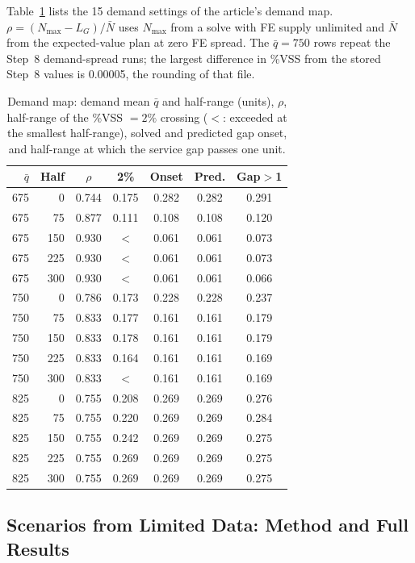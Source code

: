 Table~\ref{tab:S-extA-demand} lists the 15 demand settings of the article's demand map. $\rho=(N_{\max}-L_G)/\bar N$ uses $N_{\max}$ from a solve with FE supply unlimited and $\bar N$ from the expected-value plan at zero FE spread. The $\bar q=750$ rows repeat the Step~8 demand-spread runs; the largest difference in \%VSS from the stored Step~8 values is 0.00005, the rounding of that file.

\begin{table}[t]
\centering
\caption{Demand map: demand mean $\bar q$ and half-range (units), $\rho$, half-range of the \%VSS $=2\%$ crossing ($<$: exceeded at the smallest half-range), solved and predicted gap onset, and half-range at which the service gap passes one unit.}
\label{tab:S-extA-demand}
\footnotesize
\setlength{\tabcolsep}{3.5pt}
\begin{tabular}{@{}rrccccc@{}}
\toprule
$\bar q$ & \textbf{Half} & $\rho$ & \textbf{2\%} & \textbf{Onset} & \textbf{Pred.} & \textbf{Gap$>$1} \\
\midrule
675 & 0 & 0.744 & 0.175 & 0.282 & 0.282 & 0.291 \\
675 & 75 & 0.877 & 0.111 & 0.108 & 0.108 & 0.120 \\
675 & 150 & 0.930 & $<$ & 0.061 & 0.061 & 0.073 \\
675 & 225 & 0.930 & $<$ & 0.061 & 0.061 & 0.073 \\
675 & 300 & 0.930 & $<$ & 0.061 & 0.061 & 0.066 \\
750 & 0 & 0.786 & 0.173 & 0.228 & 0.228 & 0.237 \\
750 & 75 & 0.833 & 0.177 & 0.161 & 0.161 & 0.179 \\
750 & 150 & 0.833 & 0.178 & 0.161 & 0.161 & 0.179 \\
750 & 225 & 0.833 & 0.164 & 0.161 & 0.161 & 0.169 \\
750 & 300 & 0.833 & $<$ & 0.161 & 0.161 & 0.169 \\
825 & 0 & 0.755 & 0.208 & 0.269 & 0.269 & 0.276 \\
825 & 75 & 0.755 & 0.220 & 0.269 & 0.269 & 0.284 \\
825 & 150 & 0.755 & 0.242 & 0.269 & 0.269 & 0.275 \\
825 & 225 & 0.755 & 0.269 & 0.269 & 0.269 & 0.275 \\
825 & 300 & 0.755 & 0.269 & 0.269 & 0.269 & 0.275 \\
\bottomrule
\end{tabular}
\end{table}

\subsection{Scenarios from Limited Data: Method and Full Results}

